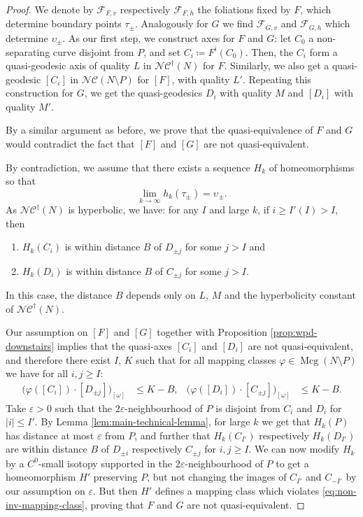 \documentclass[10pt,a4paper]{amsart}
\let\epsilon\varepsilon
\newcommand{\ncg}{\mathcal{NC}}
\newcommand{\fncg}{\mathcal{NC}^\dagger}
\begin{document}
\begin{proof}
We denote by $\mathcal{F}_{F,v}$ respectively $\mathcal{F}_{F,h}$ the foliations fixed by $F$, which determine boundary points $\tau_\pm$.
Analogously for $G$ we find $\mathcal{F}_{G,v}$ and $\mathcal{F}_{G,h}$ which determine $\upsilon_\pm$.
As our first step, we construct axes for $F$ and $G$:
let $C_0$ a non-separating curve disjoint from $P$, and set $C_i \coloneqq F^i(C_0)$.
Then, the $C_i$ form a quasi-geodesic axis of quality $L$ in $\fncg(N)$ for $F$.
Similarly, we also get a quasi-geodesic $[C_i]$ in $\ncg(N\setminus P)$ for $[F]$, with quality $L'$.
Repeating this construction for $G$, we get the quasi-geodesics $D_i$ with quality $M$ and $[D_i]$ with quality $M'$.

By a similar argument as before, we prove that the quasi-equivalence of $F$ and $G$ would contradict the fact that $[F]$ and $[G]$ are not quasi-equivalent.

By contradiction, we assume that there exists a sequence $H_k$ of homeomorphisms so that
\[\lim_{k\to\infty} h_k(\tau_\pm) = \upsilon_\pm.\]
As $\fncg(N)$ is hyperbolic, we have:
for any $I$ and large $k$, if $i\geq I'(I) > I$, then \begin{enumerate}
    \item $H_k(C_i)$ is within distance $B$ of $D_{\pm j}$ for some $j>I$ and
    \item $H_k(D_{i})$ is within distance $B$ of $C_{\pm j}$ for some $j>I$.
\end{enumerate}
In this case, the distance $B$ depends only on $L$, $M$ and the hyperbolicity constant of $\fncg(N)$.

Our assumption on $[F]$ and $[G]$ together with Proposition \ref{prop:wpd-downstairs} implies that the quasi-axes $[C_i]$ and $[D_i]$ are not quasi-equivalent, and therefore there exist $I$, $K$ such that for all mapping classes $\varphi\in\operatorname{Mcg}(N\setminus P)$ we have for all $i,j\geq I$:
\begin{align}\label{eq:non-inv-mapping-class} \big(\varphi([C_i])\cdot [D_{\pm j}]\big)_{[\omega]} &\leq K - B, & \big(\varphi([D_{i}])\cdot [C_{\pm j}]\big)_{[\omega]} &\leq K - B.\end{align}
Take $\epsilon>0$ such that the $2\epsilon$-neighbourhood of $P$ is disjoint from $C_i$ and $D_i$ for $\lvert i \rvert \leq I'$.
By Lemma \ref{lem:main-technical-lemma}, for large $k$ we get that $H_k(P)$ has distance at most $\epsilon$ from $P$, and further that $H_k(C_{I'})$ respectively $H_k(D_{I'})$ are within distance $B$ of $D_{\pm i}$ respectively $C_{\pm j}$ for $i,j\geq I$.
We can now modify $H_k$ by a $C^0$-small isotopy supported in the $2\epsilon$-neighbourhood of $P$ to get a homeomorphism $H'$ preserving $P$, but not changing the images of $C_{I'}$ and $C_{-I'}$ by our assumption on $\epsilon$.
But then $H'$ defines a mapping class which violates \eqref{eq:non-inv-mapping-class}, proving that $F$ and $G$ are not quasi-equivalent.
\end{proof}
\end{document}
